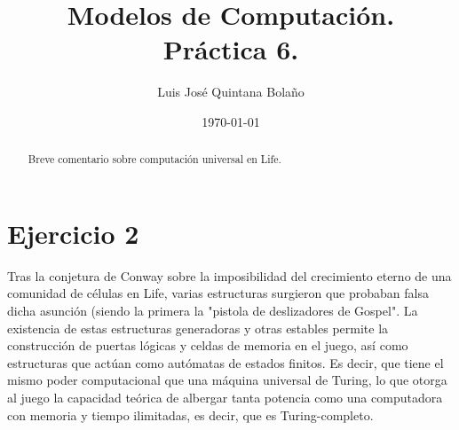 \documentclass[a4paper]{article}
\title{Modelos de Computación.\\ Práctica 6. }
\author{Luis José Quintana Bolaño}
\date{\today}
\begin{document}
	\maketitle
	\begin{abstract}
	    Breve comentario sobre computación universal en Life.
  	\end{abstract}
	\section{Ejercicio 2}
		Tras la conjetura de Conway sobre la imposibilidad del crecimiento eterno de una comunidad de células en Life, varias estructuras surgieron que probaban falsa dicha asunción (siendo la primera la "pistola de deslizadores de Gospel". La existencia de estas estructuras generadoras y otras estables permite la construcción de puertas lógicas y celdas de memoria en el juego, así como estructuras que actúan como autómatas de estados finitos. Es decir, que tiene el mismo poder computacional que una máquina universal de Turing, lo que otorga al juego la capacidad teórica de albergar tanta potencia como una computadora con memoria y tiempo ilimitadas, es decir, que es Turing-completo.
\end{document}
